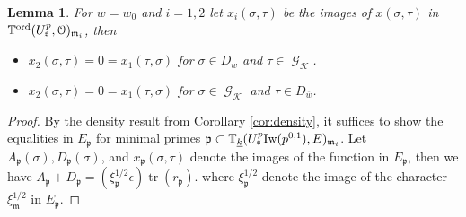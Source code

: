 \documentclass[leqno]{amsart}
\newtheorem{lem}[thm]{Lemma}
\theoremstyle{definition}
\theoremstyle{remark}
\newcommand{\eo}{\EuScript{O}}
\DeclareMathOperator{\mtr}{tr}
\DeclareMathOperator{\Gal}{\mathcal{G}}
\newcommand{\fm}{\mathfrak{m}}
\newcommand{\fp}{\mathfrak{p}}
\newcommand{\fs}{\mathfrak{s}}
\newcommand{\K}{{\mathcal{K}}} %
\newcommand{\bw}{{\overline{w}}}
\newcommand{\wt}[1]{\underline{ #1 }}
\newcommand{\Iw}{\textnormal{Iw}} %
\newcommand{\TT}{\mathbb{T}} %
\newcommand{\ord}{\textnormal{ord}} %
\begin{document}
\begin{lem}
For $w=w_0$ and $i=1,2$ let
$x_i(\sigma,\tau)$ be the images of $x(\sigma,\tau)$ in
$\TT^{\ord}(U^p_\fs,\eo)_{\fm_i}$, then 
\begin{itemize}
    \item $x_2(\sigma,\tau)=0=x_1(\tau, \sigma)$ 
    for $\sigma\in D_{w}$ and $\tau\in\Gal_\K$.
    \item $x_2(\sigma,\tau)=0=x_1(\tau,\sigma)$ 
    for $\sigma\in \Gal_\K$ and $\tau\in D_{\bw}$.
\end{itemize}
\end{lem}


\begin{proof}

By the density result from Corollary \ref{cor:density},
it suffices to show the equalities in $E_\fp$
for minimal primes
$\fp\subset \TT_{\wt{k}}(U^p_\fs\Iw(p^{0,1}),E)_{\fm_i}$.
Let $A_\fp(\sigma), D_\fp(\sigma)$, and $x_\fp(\sigma,\tau)$
denote the images of the function in $E_\fp$,
then we have $A_\fp+D_\fp=(\xi_\fp^{1/2}\epsilon)\mtr(r_\fp)$.
where $\xi_\fp^{1/2}$ denote the image 
of the character $\xi_\fm^{1/2}$ in $E_\fp$.


\end{proof}
\end{document}
